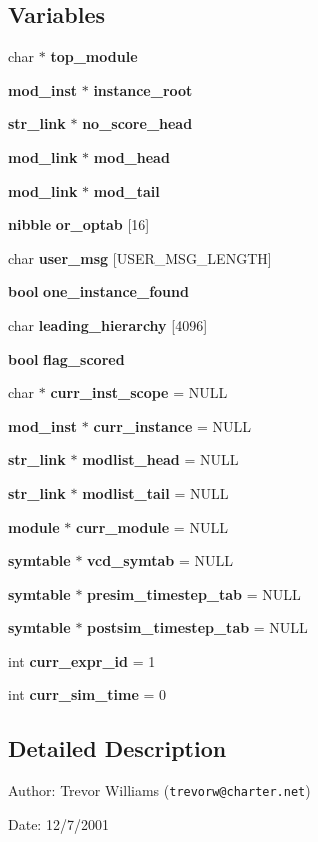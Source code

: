 \subsection*{Variables}
\begin{CompactItemize}
\item 
char $\ast$ {\bf top\_\-module}
\item 
{\bf mod\_\-inst} $\ast$ {\bf instance\_\-root}
\item 
{\bf str\_\-link} $\ast$ {\bf no\_\-score\_\-head}
\item 
{\bf mod\_\-link} $\ast$ {\bf mod\_\-head}
\item 
{\bf mod\_\-link} $\ast$ {\bf mod\_\-tail}
\item 
{\bf nibble} {\bf or\_\-optab} [16]
\item 
char {\bf user\_\-msg} [USER\_\-MSG\_\-LENGTH]
\item 
{\bf bool} {\bf one\_\-instance\_\-found}
\item 
char {\bf leading\_\-hierarchy} [4096]
\item 
{\bf bool} {\bf flag\_\-scored}
\item 
char $\ast$ {\bf curr\_\-inst\_\-scope} = NULL
\item 
{\bf mod\_\-inst} $\ast$ {\bf curr\_\-instance} = NULL
\item 
{\bf str\_\-link} $\ast$ {\bf modlist\_\-head} = NULL
\item 
{\bf str\_\-link} $\ast$ {\bf modlist\_\-tail} = NULL
\item 
{\bf module} $\ast$ {\bf curr\_\-module} = NULL
\item 
{\bf symtable} $\ast$ {\bf vcd\_\-symtab} = NULL
\item 
{\bf symtable} $\ast$ {\bf presim\_\-timestep\_\-tab} = NULL
\item 
{\bf symtable} $\ast$ {\bf postsim\_\-timestep\_\-tab} = NULL
\item 
int {\bf curr\_\-expr\_\-id} = 1
\item 
int {\bf curr\_\-sim\_\-time} = 0
\end{CompactItemize}


\subsection{Detailed Description}
\begin{Desc}
\item[Author:]Trevor Williams ({\tt trevorw@charter.net}) \end{Desc}
\begin{Desc}
\item[Date:]12/7/2001\end{Desc}



